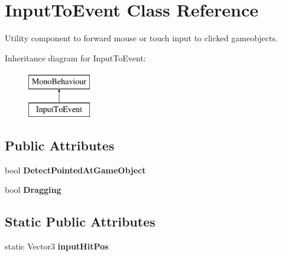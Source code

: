 \hypertarget{class_input_to_event}{}\section{Input\+To\+Event Class Reference}
\label{class_input_to_event}


Utility component to forward mouse or touch input to clicked gameobjects.  


Inheritance diagram for Input\+To\+Event\+:\begin{figure}[H]
\begin{center}
\leavevmode
\includegraphics[height=2.000000cm]{class_input_to_event}
\end{center}
\end{figure}
\subsection*{Public Attributes}
\begin{DoxyCompactItemize}
\item 
bool {\bfseries Detect\+Pointed\+At\+Game\+Object}\hypertarget{class_input_to_event_ae4f958f81632ea46ce83ef9ae8801b69}{}\label{class_input_to_event_ae4f958f81632ea46ce83ef9ae8801b69}

\item 
bool {\bfseries Dragging}\hypertarget{class_input_to_event_a7962fc265dae0897c0d703a4ddabf466}{}\label{class_input_to_event_a7962fc265dae0897c0d703a4ddabf466}

\end{DoxyCompactItemize}
\subsection*{Static Public Attributes}
\begin{DoxyCompactItemize}
\item 
static Vector3 {\bfseries input\+Hit\+Pos}\hypertarget{class_input_to_event_afed01280ab0eb13db78bf20e6ddc8110}{}\label{class_input_to_event_afed01280ab0eb13db78bf20e6ddc8110}

\end{DoxyCompactItemize}
